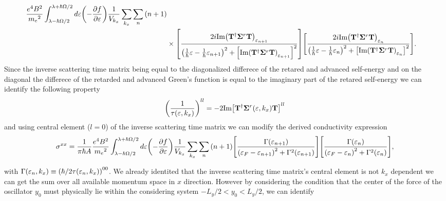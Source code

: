 \begin{widetext}
\begin{equation}
\begin{aligned}
    \frac{e^4B^2}{{{m_e}^2}}
    \int_{\lambda-\hbar\Omega/2}^{\lambda+ \hbar\Omega/2} d\varepsilon
    \qty(
    -\frac{\partial f}{\partial \varepsilon})
    \frac{1}{V_{k_x}} \sum_{k_x} \sum_{n}
    \qty(n+1)
    \\
    & \times
    \qty[
    \frac{2i \text{Im}\qty(\vb{T}^{\dagger} \vb{\Sigma}^r \vb{T})_{\varepsilon_{n+1}}
    }
    {
    \qty(
    \frac{1}{\hbar}\varepsilon -
    \frac{1}{\hbar}\varepsilon_{n+1}
    )^2
    + \qty[\text{Im}\qty(\vb{T}^{\dagger} \vb{\Sigma}^r \vb{T})_{\varepsilon_{n+1}}]^2
    }]
    \qty[
    \frac{2i \text{Im}\qty(\vb{T}^{\dagger} \vb{\Sigma}^r \vb{T})_{\varepsilon_{n}}
    }
    {
    \qty(
    \frac{1}{\hbar}\varepsilon -
    \frac{1}{\hbar}\varepsilon_{n}
    )^2
    + \qty[\text{Im}\qty(\vb{T}^{\dagger} \vb{\Sigma}^r \vb{T})_{\varepsilon_{n}}]^2
    }].
  \end{aligned}
\end{equation}
Since the inverse scattering time matrix being equal to the diagonalized differece of the retared and advanced self-energy and on the diagonal the differece of the retarded and advanced Green's function is equal to the imaginary part of the retared self-energy \cite{wackerl20,wackerlthesis20} we can identify the following property
\begin{equation} \label{eq_28}
  \qty(\frac{1}{\tau(\varepsilon,k_x)})^{ll} =
  -2\text{Im}\qty[ \vb{T}^{\dagger} \vb{\Sigma}^r(\varepsilon,k_x) \vb{T}]^{ll}
\end{equation}
and using central element ($l=0$) of the inverse scattering time matrix we can modify the derived conductivity expression
\begin{equation} \label{eq_29}
    {\sigma}^{xx}   =
    \frac{1}{\pi\hbar A}
    \frac{e^4B^2}{{{m_e}^2}}
    \int_{\lambda-\hbar\Omega/2}^{\lambda+ \hbar\Omega/2} d\varepsilon
    \qty(
    -\frac{\partial f}{\partial \varepsilon})
    \frac{1}{V_{k_x}} \sum_{k_x} \sum_{n}
    \qty(n+1)
    \qty[
    \frac{\Gamma(\varepsilon_{n+1})
    }
    {
    \qty(
    \varepsilon_F - \varepsilon_{n+1}
    )^2
    + \Gamma^2(\varepsilon_{n+1})
    }]
    \qty[
    \frac{\Gamma(\varepsilon_{n})
    }
    {
    \qty(
    \varepsilon_F - \varepsilon_{n}
    )^2
    + \Gamma^2(\varepsilon_{n})
    }],
\end{equation}
\end{widetext}
with $\Gamma(\varepsilon_n,k_x) \equiv \qty({\hbar}/{2\tau(\varepsilon_n,k_x)})^{00}$. We already identited that the inverse scattering time matrix's central element is not $k_x$ dependent we can get the sum over all available momentum space in $x$ direction. However by considering the condition that the center of the force of the oscillator $y_0$ must physically lie within the considering system $-L_y/2 < y_0 < L_y/2$, we can identify
